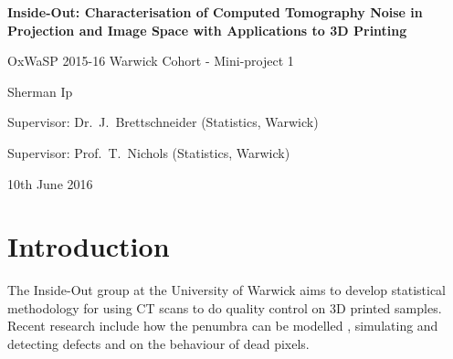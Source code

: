 \documentclass[12pt]{report}
\begin{document}
\begin{titlepage}
\centering
\vspace*{1cm}
        
        \LARGE
        \textbf{Inside-Out: Characterisation of Computed Tomography Noise in Projection and Image Space with Applications to 3D Printing}
        
		\large        
        
        \vspace{2cm}
        {OxWaSP 2015-16 Warwick Cohort - Mini-project 1}
        
        \vspace{1cm}
        {Sherman Ip}

        \vspace{1cm}
        {Supervisor: Dr.~J.~Brettschneider (Statistics, Warwick)}
        
        \vspace{1cm}
        {Supervisor: Prof.~T.~Nichols (Statistics, Warwick)}
        
        \vspace{1cm}
        {10th June 2016}
\end{titlepage}

\begin{abstract}
I did this. This happened. I should of done that.
\end{abstract}

\renewcommand{\abstractname}{Acknowledgements}
\begin{abstract}
\begin{itemize}
	\item Supervisors: Julia Brettschneider and Tom Nichols
	\item Inside Out Team: Wilfrid Kendall, Audrey Kueh, Jay Warnett and Clair Barnes
	\item OxWaSP 2015 Cohort: Nathan Cunningham, Giuseppe di Benedetto, Beniamino Hadj-Amar, Jack Jewson, Ella Kaye, Leon Law, Kaspar Martens, Marcin Mider, Xenia Miscouridou, Paul Vanetti and Andi Wang.
	\item EPSRC Funding: EP/L016710/1
\end{itemize}
\end{abstract}

\tableofcontents

\chapter{Introduction}
The Inside-Out group at the University of Warwick aims to develop statistical methodology for using CT scans to do quality control on 3D printed samples. Recent research include how the penumbra can be modelled \cite{kueh2014modelling}, simulating and detecting defects and on the behaviour of dead pixels.
\end{document}
